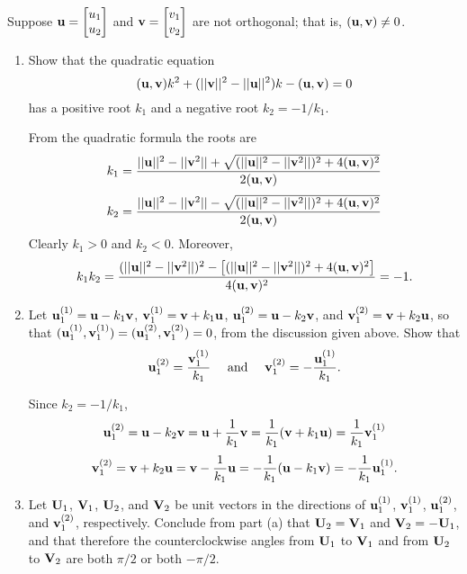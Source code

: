 \documentclass{ximera}
\begin{document}
 \begin{problem}\label{exer:10.6.28}
Suppose ${\bf u}=  \begin{bmatrix}u_1\\u_2\end{bmatrix}$ and ${\bf
v}=  \begin{bmatrix}v_1\\v_2\end{bmatrix}$ are not orthogonal; that is, $({\bf
u},{\bf v})\ne0$.
\begin{enumerate}
\item %
Show that  the quadratic equation
$$
({\bf u},{\bf v})k^2+(||{\bf v}||^2-||{\bf u}||^2)k-({\bf u},{\bf
v})=0
$$
has a positive root $k_1$ and a negative root $k_2=-1/k_1$.

\begin{solution}
    From the quadratic formula the roots are
$$
k_1=\frac{||{\bf u}||^2-||{\bf v}^2||+\sqrt{(||{\bf u}||^2-||{\bf
v}^2||)^2+4({\bf u},{\bf v})^2}}{2({\bf u},{\bf v})}
$$
$$
k_2=\frac{||{\bf u}||^2-||{\bf v}^2||-\sqrt{(||{\bf u}||^2-||{\bf
v}^2||)^2+4({\bf u},{\bf v})^2}}{2({\bf u},{\bf v})}
$$
Clearly $k_1>0$ and $k_2<0$. Moreover,
$$
k_1k_2=\frac{(||{\bf u}||^2-||{\bf v}^2||)^2-\left[(||{\bf u}||^2-||{\bf
v}^2||)^2+4({\bf u},{\bf v})^2\right]}{4({\bf u},{\bf v})^2}=-1.
$$
\end{solution}

\item %
Let ${\bf u}_1^{(1)}={\bf u}-k_1{\bf v}$, ${\bf v}_1^{(1)}={\bf
v}+k_1{\bf u}$, ${\bf u}_1^{(2)}={\bf u}-k_2{\bf v}$, and ${\bf
v}_1^{(2)}={\bf v}+k_2{\bf u}$, so that $({\bf u}_1^{(1)},{\bf
v}_1^{(1)}) =({\bf u}_1^{(2)},{\bf v}_1^{(2)})=0$, from the discussion
given above. Show that
$$
{\bf u}_1^{(2)}=\frac{{\bf v}_1^{(1)}}{ k_1}
\quad\text{ and }\quad
{\bf v}_1^{(2)}=-\frac{{\bf u}_1^{(1)}}{ k_1}.
$$

\begin{solution}
    Since $k_2=-1/k_1$,
$$
{\bf u}_1^{(2)}={\bf u}-k_2{\bf v}={\bf u}+\frac{1}{k_1}{\bf
v}=\frac{1}{k_1}({\bf v}+k_1{\bf u})=\frac{1}{k_1}{\bf v}_1^{(1)}
$$
$$
{\bf v}_1^{(2)}={\bf v}+k_2{\bf u}={\bf v}-\frac{1}{k_1}{\bf
u}=-\frac{1}{k_1}({\bf u}-k_1{\bf v})=-\frac{1}{k_1}{\bf u}_1^{(1)}.
$$
\end{solution}

\item %
Let ${\bf U}_1$, ${\bf V}_1$, ${\bf U}_2$, and ${\bf V}_2$ be unit
vectors in the directions of ${\bf u}_1^{(1)}$, ${\bf v}_1^{(1)}$,
${\bf u}_1^{(2)}$, and ${\bf v}_1^{(2)}$, respectively. Conclude from
part (a) that ${\bf U}_2={\bf V}_1$ and ${\bf V}_2=-{\bf U}_1$, and
that therefore the counterclockwise angles from ${\bf U}_1$ to ${\bf
V}_1$ and from ${\bf U}_2$ to ${\bf V}_2$ are both $\pi/2$ or both
$-\pi/2$.
\end{enumerate}
\end{problem}
\end{document}
